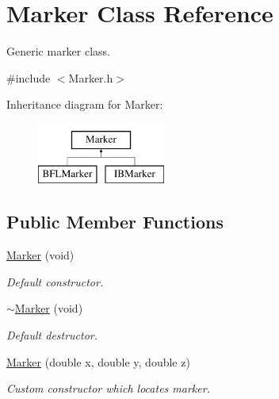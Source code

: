 \hypertarget{class_marker}{}\section{Marker Class Reference}
\label{class_marker}


Generic marker class.  




{\ttfamily \#include $<$Marker.\+h$>$}

Inheritance diagram for Marker\+:\begin{figure}[H]
\begin{center}
\leavevmode
\includegraphics[height=2.000000cm]{class_marker}
\end{center}
\end{figure}
\subsection*{Public Member Functions}
\begin{DoxyCompactItemize}
\item 
\hyperlink{class_marker_ac09c0211aaad490b0dd4ac448c69ba36}{Marker} (void)
\begin{DoxyCompactList}\small\item\em Default constructor. \end{DoxyCompactList}\item 
\hyperlink{class_marker_ac34f00758cfb07bcf550209083633eb6}{$\sim$\+Marker} (void)
\begin{DoxyCompactList}\small\item\em Default destructor. \end{DoxyCompactList}\item 
\hyperlink{class_marker_a1e5a9aa6f1002b5f2ce6c5220ee01225}{Marker} (double x, double y, double z)
\begin{DoxyCompactList}\small\item\em Custom constructor which locates marker. \end{DoxyCompactList}\end{DoxyCompactItemize}
